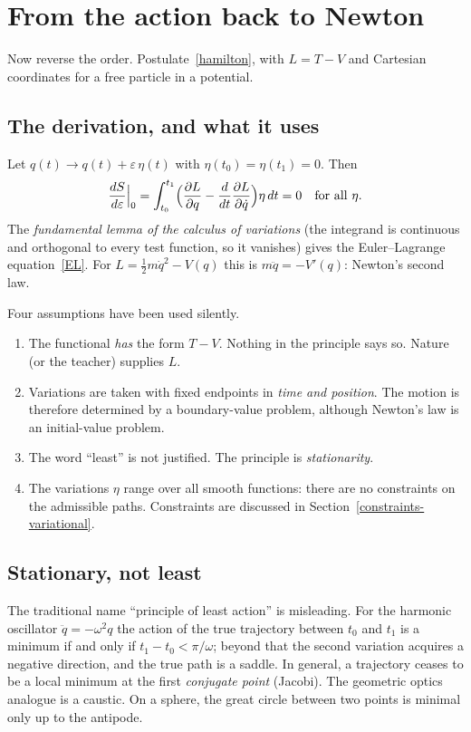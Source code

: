 \section{From the action back to Newton}
\label{action-to-newton}

Now reverse the order. Postulate~\eqref{hamilton}, with $L=T-V$ and
Cartesian coordinates for a free particle in a potential.

\subsection{The derivation, and what it uses}

Let $q(t)\to q(t)+\varepsilon\,\eta(t)$ with $\eta(t_0)=\eta(t_1)=0$. Then
\[
  \frac{dS}{d\varepsilon}\Big|_0=\int_{t_0}^{t_1}
  \Bigl(\frac{\partial L}{\partial q}-\frac{d}{dt}\frac{\partial L}{\partial\dot q}\Bigr)\eta\,dt=0
  \quad\text{for all }\eta .
\]
The \emph{fundamental lemma of the calculus of variations} (the integrand is
continuous and orthogonal to every test function, so it vanishes) gives the
Euler--Lagrange equation~\eqref{EL}. For $L=\tfrac12m\dot q^2-V(q)$ this is
$m\ddot q=-V'(q)$: Newton's second law.

Four assumptions have been used silently.
\begin{enumerate}
  \item The functional \emph{has} the form $T-V$. Nothing in the principle
  says so. Nature (or the teacher) supplies $L$.
  \item Variations are taken with fixed endpoints in \emph{time and
  position}. The motion is therefore determined by a boundary-value problem,
  although Newton's law is an initial-value problem.
  \item The word ``least'' is not justified. The principle is
  \emph{stationarity}.
  \item The variations $\eta$ range over all smooth functions: there are no
  constraints on the admissible paths. Constraints are discussed in
  Section~\ref{constraints-variational}.
\end{enumerate}

\subsection{Stationary, not least}
\label{least}

The traditional name ``principle of least action'' is misleading. For the
harmonic oscillator $\ddot q=-\omega^2q$ the action of the true trajectory
between $t_0$ and $t_1$ is a minimum if and only if $t_1-t_0<\pi/\omega$;
beyond that the second variation acquires a negative direction, and the
true path is a saddle. In general, a trajectory ceases to be a local minimum
at the first \emph{conjugate point} (Jacobi). The geometric optics analogue is
a caustic. On a sphere, the great circle between two points is minimal only
up to the antipode.

